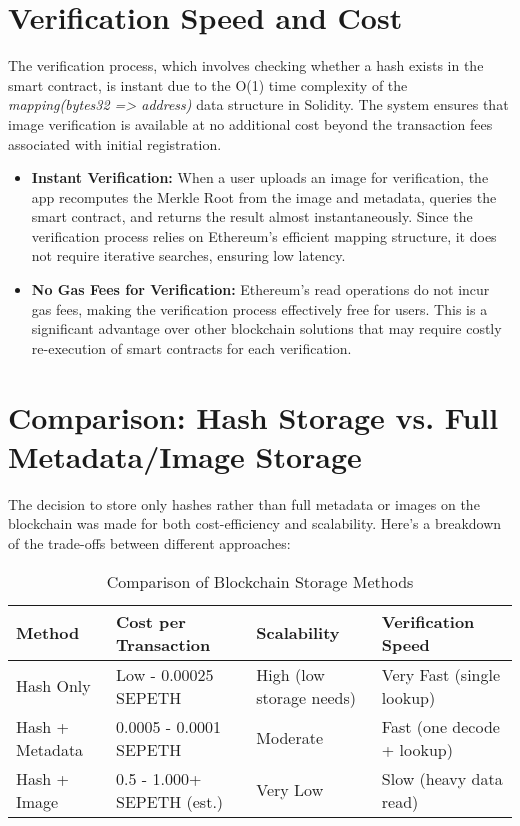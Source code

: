 \section{Verification Speed and Cost}
The verification process, which involves checking whether a hash exists in the smart contract, is instant due to the O(1) time complexity of the \textit{mapping(bytes32 => address)} data structure in Solidity. The system ensures that image verification is available at no additional cost beyond the transaction fees associated with initial registration.
\begin{itemize}
    \item \textbf{Instant Verification:} When a user uploads an image for verification, the app recomputes the Merkle Root from the image and metadata, queries the smart contract, and returns the result almost instantaneously. Since the verification process relies on Ethereum’s efficient mapping structure, it does not require iterative searches, ensuring low latency.
    \item \textbf{No Gas Fees for Verification:} Ethereum’s read operations do not incur gas fees, making the verification process effectively free for users. This is a significant advantage over other blockchain solutions that may require costly re-execution of smart contracts for each verification.
\end{itemize}

\section{Comparison: Hash Storage vs. Full Metadata/Image Storage}
The decision to store only hashes rather than full metadata or images on the blockchain was made for both cost-efficiency and scalability. Here’s a breakdown of the trade-offs between different approaches:


\begin{table}[ht]
    \centering
    \begin{tabularx}{\textwidth}{|X|X|X|X|}
        \hline
        \textbf{Method} & \textbf{Cost per Transaction} & \textbf{Scalability} & \textbf{Verification Speed} \\ \hline
        Hash Only & Low - 0.00025 SEPETH & High (low storage needs) & Very Fast (single lookup) \\ \hline
        Hash + Metadata & 0.0005 - 0.0001 SEPETH  & Moderate &  Fast (one decode + lookup) \\ \hline
        Hash + Image & 0.5 - 1.000+ SEPETH (est.) & Very Low & Slow (heavy data read) \\ \hline
    \end{tabularx}
    \caption{Comparison of Blockchain Storage Methods}
    \label{tab:storageMethods}
\end{table}

